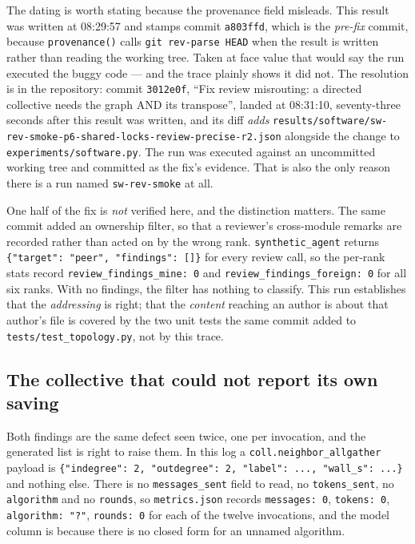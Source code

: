 \documentclass[11pt]{article}
\begin{document}
The dating is worth stating because the provenance field misleads. This result was written at
08:29:57 and stamps commit \texttt{a803ffd}, which is the \emph{pre-fix} commit, because
\texttt{provenance()} calls \texttt{git rev-parse HEAD} when the result is written rather than
reading the working tree. Taken at face value that would say the run executed the buggy code
--- and the trace plainly shows it did not. The resolution is in the repository: commit
\texttt{3012e0f}, ``Fix review misrouting: a directed collective needs the graph AND its
transpose'', landed at 08:31:10, seventy-three seconds after this result was written, and its
diff \emph{adds} \texttt{results/software/sw-rev-smoke-p6-shared-locks-review-precise-r2.json}
alongside the change to \texttt{experiments/software.py}. The run was executed against an
uncommitted working tree and committed as the fix's evidence. That is also the only reason
there is a run named \texttt{sw-rev-smoke} at all.

One half of the fix is \emph{not} verified here, and the distinction matters. The same commit
added an ownership filter, so that a reviewer's cross-module remarks are recorded rather than
acted on by the wrong rank. \texttt{synthetic\_agent} returns \texttt{\{"target": "peer",
"findings": []\}} for every review call, so the per-rank stats record
\texttt{review\_findings\_mine: 0} and \texttt{review\_findings\_foreign: 0} for all six ranks.
With no findings, the filter has nothing to classify. This run establishes that the
\emph{addressing} is right; that the \emph{content} reaching an author is about that author's
file is covered by the two unit tests the same commit added to
\texttt{tests/test\_topology.py}, not by this trace.

\subsection*{The collective that could not report its own saving}

Both  findings are the same defect seen twice, one per invocation, and the
generated list is right to raise them. In this log a \texttt{coll.neighbor\_allgather} payload
is \texttt{\{"indegree": 2, "outdegree": 2, "label": ..., "wall\_s": ...\}} and nothing else.
There is no \texttt{messages\_sent} field to read, no \texttt{tokens\_sent}, no
\texttt{algorithm} and no \texttt{rounds}, so \texttt{metrics.json} records \texttt{messages:
0}, \texttt{tokens: 0}, \texttt{algorithm: "?"}, \texttt{rounds: 0} for each of the twelve
invocations, and the model column is \texttt{\modelna} because there is no closed form for an
unnamed algorithm.
\end{document}
